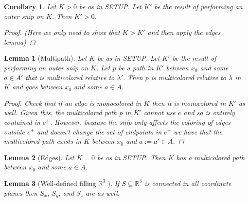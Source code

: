 \documentclass{article}
\theoremstyle{mystyle}
\newtheorem{lem}{Lemma}[section]
\newtheorem*{cor*}{Corollary}
\theoremstyle{remark}
\begin{document}
\begin{cor*}
	Let \(K > 0\) be as in SETUP. Let \(K'\) be the result of performing an outer snip on \(K\). Then \(K' > 0\).
	\begin{proof}
        (Here we only need to show that \(K > K'\) and then apply the edges lemma)
		
	\end{proof}
\end{cor*}
\begin{lem}
	[Multipath]
	 \label{lem:multi} 
	Let \(K\) be as in SETUP. Let \(K'\) be the result of performing an outer snip on \(K\). Let \(p\) be a path in \(K'\) between \(x_{0}\) and some \(a \in A'\) that is {\em multicolored} relative to \(\lambda'\). Then \(p\) is multicolored relative to \(\lambda\) in \(K\) and goes between \(x_{0}\) and some \(a \in A\).
	\begin{proof}
		Check that if an edge is monocolored in \(K\) then it is monocolored in \(K'\) as well. Given this, the multicolored path \(p\) in \(K'\) cannot use \(e\) and so is entirely contained in \(e^{+}\). However, because the snip only affects the coloring of edges outside \(e^{+}\) and doesn't change the set of endpoints in \(e^{+}\) we have that the multicolored path exists in \(K\) between \(x_{0}\) and \(a:=a' \in A\).
	\end{proof}
\end{lem}
\begin{lem}
	[Edges]
	 \label{edges} 
	  Let \(K=0\) be as in SETUP. Then \(K\) has a multicolored path between \(x_{0}\) and some \(a \in A\).
\end{lem}%

\begin{lem}
	[Well-defined filling \(\mathbb{R}^{3}\) ]

	If \(S \subseteq \mathbb{R}^{3}\) is connected in all coordinate planes then \(S_x\), \(S_{y}\), and \(S_{z}\) are as well. 
	

\end{lem}
\end{document}
